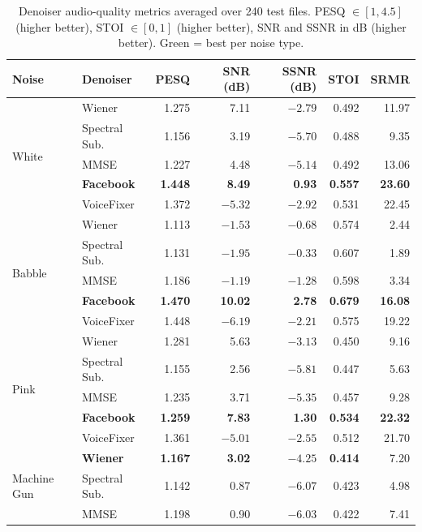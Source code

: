 \documentclass[12pt,a4paper,onecolumn]{exam}
\newcommand{\best}[1]{\cellcolor{bestcol}\textbf{#1}}
\begin{document}
\begin{table}
\centering
\caption{Denoiser audio-quality metrics averaged over 240 test files.
PESQ $\in[1,4.5]$ (higher better), STOI $\in[0,1]$ (higher better),
SNR and SSNR in dB (higher better). Green = best per noise type.}
\label{tab:33_metrics}
\small
\setlength{\tabcolsep}{5pt}
\begin{tabular}{llrrrrr}
\toprule
\textbf{Noise} & \textbf{Denoiser} & \textbf{PESQ} & \textbf{SNR (dB)} & \textbf{SSNR (dB)} & \textbf{STOI} & \textbf{SRMR} \\
\midrule
\multirow{5}{*}{White}
 & Wiener         & 1.275 &  7.11 & $-2.79$ & 0.492 & 11.97 \\
 & Spectral Sub.  & 1.156 &  3.19 & $-5.70$ & 0.488 &  9.35 \\
 & MMSE           & 1.227 &  4.48 & $-5.14$ & 0.492 & 13.06 \\
 & \best{Facebook}& \best{1.448} & \best{8.49} & \best{0.93} & \best{0.557} & \best{23.60} \\
 & VoiceFixer     & 1.372 & $-5.32$ & $-2.92$ & 0.531 & 22.45 \\
\midrule
\multirow{5}{*}{Babble}
 & Wiener         & 1.113 & $-1.53$ & $-0.68$ & 0.574 &  2.44 \\
 & Spectral Sub.  & 1.131 & $-1.95$ & $-0.33$ & 0.607 &  1.89 \\
 & MMSE           & 1.186 & $-1.19$ & $-1.28$ & 0.598 &  3.34 \\
 & \best{Facebook}& \best{1.470} & \best{10.02} & \best{2.78} & \best{0.679} & \best{16.08} \\
 & VoiceFixer     & 1.448 & $-6.19$ & $-2.21$ & 0.575 & 19.22 \\
\midrule
\multirow{5}{*}{Pink}
 & Wiener         & 1.281 &  5.63 & $-3.13$ & 0.450 &  9.16 \\
 & Spectral Sub.  & 1.155 &  2.56 & $-5.81$ & 0.447 &  5.63 \\
 & MMSE           & 1.235 &  3.71 & $-5.35$ & 0.457 &  9.28 \\
 & \best{Facebook}& \best{1.259} & \best{7.83} & \best{1.30} & \best{0.534} & \best{22.32} \\
 & VoiceFixer     & 1.361 & $-5.01$ & $-2.55$ & 0.512 & 21.70 \\
\midrule
\multirow{5}{*}{Machine Gun}
 & \best{Wiener}  & \best{1.167} & \best{3.02} & $-4.25$ & \best{0.414} &  7.20 \\
 & Spectral Sub.  & 1.142 &  0.87 & $-6.07$ & 0.423 &  4.98 \\
 & MMSE           & 1.198 &  0.90 & $-6.03$ & 0.422 &  7.41 \\

\end{tabular}
\end{table}
\end{document}
